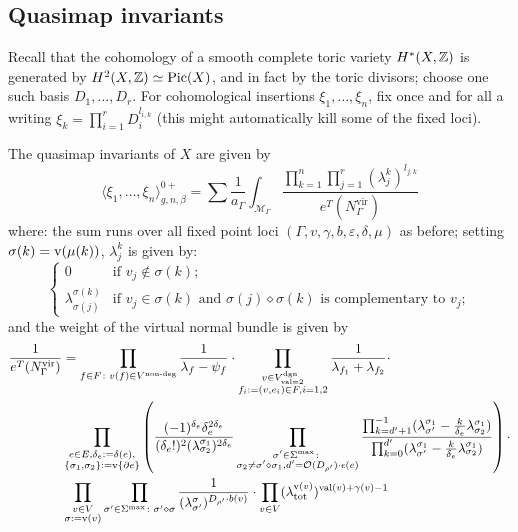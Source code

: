 \subsection{Quasimap invariants} Recall that the cohomology of a smooth complete toric variety $H^*(X,\mathbb{Z})$ is generated by $H^2(X,\mathbb{Z})\simeq\operatorname{Pic}(X)$, and in fact by the toric divisors; choose one such basis $D_1,\ldots,D_r$. For cohomological insertions $\xi_1,\ldots,\xi_n$, fix once and for all a writing $\xi_k=\prod_{i=1}^r D_i^{l_{i,k}}$ (this might automatically kill some of the fixed loci).

\begin{prop}

The quasimap invariants of $X$ are given by
\begin{equation*}
 \langle \xi_1,\ldots,\xi_n\rangle^{0+}_{g,n,\beta}=\sum \frac{1}{a_\Gamma}\int_{\mathcal M_\Gamma}\frac{\prod_{k=1}^n\prod_{j=1}^r(\lambda^k_j)^{l_{j,k}}}{e^T(N_\Gamma^\text{vir})}
\end{equation*}
where: the sum runs over all fixed point loci $\left(\Gamma, v, \gamma, b,\varepsilon,\delta,\mu\right)$ as before; setting $\sigma(k)=\operatorname{v}(\mu(k))$, $\lambda^k_j$ is given by:
\begin{equation*}
 \begin{cases}
  0 & \text{if } v_j\notin \sigma(k); \\
  \lambda^{\sigma(k)}_{\sigma(j)} & \text{if } v_j\in\sigma(k) \text{ and } \sigma(j)\diamond\sigma(k) \text{ is complementary to } v_j;
 \end{cases}
\end{equation*}
and the weight of the virtual normal bundle is given by
\begin{equation*}
 \begin{aligned}
  \frac{1}{e^T(N_\Gamma^{\text{vir}})}&=\prod_{f\in F\colon v(f)\in V^{\text{non-deg}}} \frac{1}{\lambda_f-\psi_f} \cdot \prod_{\substack{v\in V^\text{dgn}_{\operatorname{val}=2}\\ f_i:=(v,e_i)\in F, i=1,2}} \frac{1}{\lambda_{f_1}+\lambda_{f_2}} \cdot \\  
  &\prod_{\substack{e\in E, \delta_e:=\delta(e), \\ \{\sigma_1,\sigma_2\}:=\operatorname{v}\{\partial e\}}}\left( \frac{(-1)^{\delta_e}\delta_e^{2\delta_e}}{(\delta_e!)^2(\lambda^{\sigma_1}_{\sigma_2})^{2\delta_e}}\prod_{\substack{\sigma'\in\Sigma^{\text{max}}\colon \\ \sigma_2\neq\sigma'\diamond\sigma_1,d'=\mathcal{O}(D_{\rho'})\cdot \epsilon(e)}}\frac{\prod_{k=d'+1}^{-1}(\lambda^{\sigma_1}_{\sigma'}-\frac{k}{\delta_e}\lambda^{\sigma_1}_{\sigma_2})}{\prod_{k=0}^{d'}(\lambda^{\sigma_1}_{\sigma'}-\frac{k}{\delta_e}\lambda^{\sigma_1}_{\sigma_2})} \right) \cdot \\
  & \prod_{\substack{v\in V \\ \sigma:=\operatorname{v}(v)}} \prod_{\sigma'\in\Sigma^{\text{max}}\colon\sigma'\diamond\sigma}\frac{1}{(\lambda^{\sigma}_{\sigma'})^{D_{\rho'}\cdot b(v)}}\cdot \prod_{v\in V}(\lambda^{\operatorname{v}(v)}_{\text{tot}})^{\operatorname{val}(v)+\gamma(v)-1}
 \end{aligned}
\end{equation*}
\end{prop}

